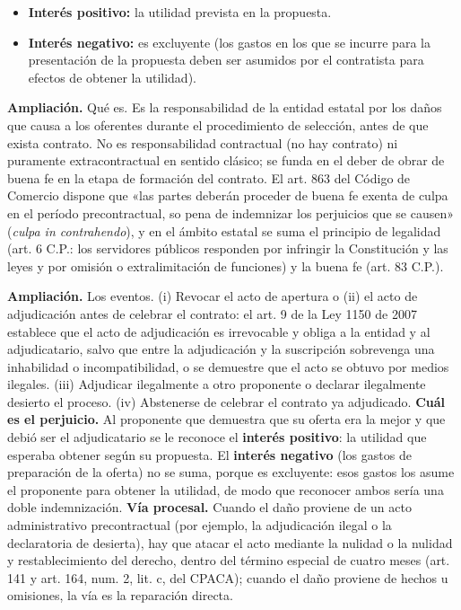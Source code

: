\begin{itemize}
\item \textbf{Interés positivo:} la utilidad prevista en la propuesta.
\item \textbf{Interés negativo:} es excluyente (los gastos en los que se incurre para la presentación de la propuesta deben ser asumidos por el contratista para efectos de obtener la utilidad).
\end{itemize}
\begin{ampliacion}
\textcolor[HTML]{5B3F8C}{\textbf{Ampliación. }}Qué es. Es la responsabilidad de la entidad estatal por los daños que causa a los oferentes durante el procedimiento de selección, antes de que exista contrato. No es responsabilidad contractual (no hay contrato) ni puramente extracontractual en sentido clásico; se funda en el deber de obrar de buena fe en la etapa de formación del contrato. El art. 863 del Código de Comercio dispone que «las partes deberán proceder de buena fe exenta de culpa en el período precontractual, so pena de indemnizar los perjuicios que se causen» (\textit{culpa in contrahendo}), y en el ámbito estatal se suma el principio de legalidad (art. 6 C.P.: los servidores públicos responden por infringir la Constitución y las leyes y por omisión o extralimitación de funciones) y la buena fe (art. 83 C.P.).
\par
\textcolor[HTML]{5B3F8C}{\textbf{Ampliación. }}Los eventos. (i) Revocar el acto de apertura o (ii) el acto de adjudicación antes de celebrar el contrato: el art. 9 de la Ley 1150 de 2007 establece que el acto de adjudicación es irrevocable y obliga a la entidad y al adjudicatario, salvo que entre la adjudicación y la suscripción sobrevenga una inhabilidad o incompatibilidad, o se demuestre que el acto se obtuvo por medios ilegales. (iii) Adjudicar ilegalmente a otro proponente o declarar ilegalmente desierto el proceso. (iv) Abstenerse de celebrar el contrato ya adjudicado. \textbf{Cuál es el perjuicio.} Al proponente que demuestra que su oferta era la mejor y que debió ser el adjudicatario se le reconoce el \textbf{interés positivo}: la utilidad que esperaba obtener según su propuesta. El \textbf{interés negativo} (los gastos de preparación de la oferta) no se suma, porque es excluyente: esos gastos los asume el proponente para obtener la utilidad, de modo que reconocer ambos sería una doble indemnización. \textbf{Vía procesal.} Cuando el daño proviene de un acto administrativo precontractual (por ejemplo, la adjudicación ilegal o la declaratoria de desierta), hay que atacar el acto mediante la nulidad o la nulidad y restablecimiento del derecho, dentro del término especial de cuatro meses (art. 141 y art. 164, num. 2, lit. c, del CPACA); cuando el daño proviene de hechos u omisiones, la vía es la reparación directa.
\end{ampliacion}
